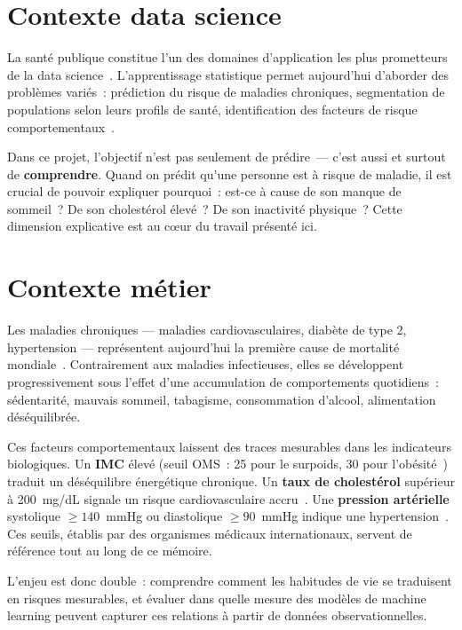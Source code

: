\section*{Contexte data science}

La santé publique constitue l'un des domaines d'application les plus prometteurs de la data science~\cite{obermeyer2016, rajpurkar2022}. L'apprentissage statistique permet aujourd'hui d'aborder des problèmes variés~: prédiction du risque de maladies chroniques, segmentation de populations selon leurs profils de santé, identification des facteurs de risque comportementaux~\cite{booth2012}.

Dans ce projet, l'objectif n'est pas seulement de prédire~--- c'est aussi et surtout de \textbf{comprendre}. Quand on prédit qu'une personne est à risque de maladie, il est crucial de pouvoir expliquer pourquoi~: est-ce à cause de son manque de sommeil~? De son cholestérol élevé~? De son inactivité physique~? Cette dimension explicative est au c\oe ur du travail présenté ici.

\section*{Contexte métier}

Les maladies chroniques --- maladies cardiovasculaires, diabète de type 2, hypertension --- représentent aujourd'hui la première cause de mortalité mondiale~\cite{booth2012}. Contrairement aux maladies infectieuses, elles se développent progressivement sous l'effet d'une accumulation de comportements quotidiens~: sédentarité, mauvais sommeil, tabagisme, consommation d'alcool, alimentation déséquilibrée.

Ces facteurs comportementaux laissent des traces mesurables dans les indicateurs biologiques. Un \textbf{IMC} élevé (seuil OMS~: 25 pour le surpoids, 30 pour l'obésité~\cite{who2000}) traduit un déséquilibre énergétique chronique. Un \textbf{taux de cholestérol} supérieur à 200~mg/dL signale un risque cardiovasculaire accru~\cite{ncep2002}. Une \textbf{pression artérielle} systolique $\geq 140$~mmHg ou diastolique $\geq 90$~mmHg indique une hypertension~\cite{esc2018}. Ces seuils, établis par des organismes médicaux internationaux, servent de référence tout au long de ce mémoire.

L'enjeu est donc double~: comprendre comment les habitudes de vie se traduisent en risques mesurables, et évaluer dans quelle mesure des modèles de machine learning peuvent capturer ces relations à partir de données observationnelles.

